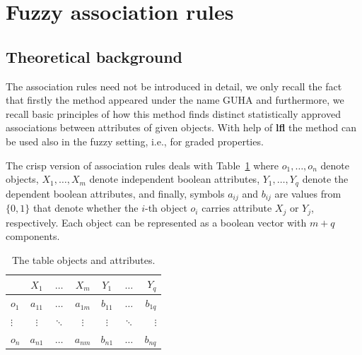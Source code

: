 \documentclass[review]{elsarticle}
\newcommand{\pkg}[1]{\textbf{#1}}
\begin{document}
\section{Fuzzy association rules}
\label{sec:assoc}

\subsection{Theoretical background}

The association rules \citep{Agrawal:assoc_rules} need not be introduced in detail, we only recall the fact that firstly the method appeared under the name GUHA \citep{Hajek:GUHA,HajekHavranek_GUHA} and furthermore, we recall basic principles of how this method finds  distinct statistically
approved associations between attributes of given objects. With help of \pkg{lfl} the method can be used also in the fuzzy setting, i.e., for graded properties. 


The crisp version of association rules deals with
Table~\ref{Tab:guha_exampleI} where $o_1,\dots, o_n$ denote objects,
$X_1,\dots , X_m$ denote independent boolean attributes, $Y_1,
\dots, Y_q$ denote the dependent boolean attributes, and
finally, symbols $a_{ij}$ and $b_{ij}$ are values from $ \{ 0,1 \}$ that denote
whether the $i$-th object $o_i$ carries attribute $X_j$ or $Y_j$, respectively. Each object can be represented as a boolean vector with $m+q$ components.

\begin{table}[ht]
  \centering
\begin{tabular}{|l|ccc|ccr|}
    \hline
          & $X_1$ & $\ldots$ & $X_m$ & $Y_1$ &  $\ldots$ & $Y_q$\\
    \hline
    $o_1$ & $a_{11}$ & $\ldots$ & $a_{1m}$ & $b_{11}$ &  $\ldots$ & $b_{1q}$\\
    $\vdots$ & $\vdots$ & $\ddots$ & $\vdots$ & $\vdots$ & $\ddots$ & $\vdots$\\
    $o_n$ & $a_{n1}$ & $\ldots$ & $a_{nm}$ & $b_{n1}$ &  $\ldots$ & $b_{nq}$\\
    \hline
\end{tabular}\caption{The table objects and attributes.} \label{Tab:guha_exampleI}
\end{table}
\end{document}
